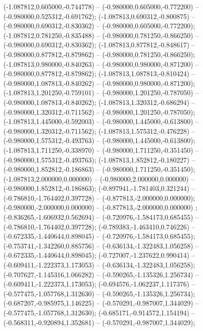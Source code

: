  (-1.087812,0.605000,-0.744778) -- (-0.980000,0.605000,-0.772200) -- (-0.980000,0.525312,-0.691762);
 (-1.087813,0.690312,-0.800875) -- (-0.980000,0.690312,-0.830362) -- (-0.980000,0.605000,-0.772200);
 (-1.087812,0.781250,-0.835488) -- (-0.980000,0.781250,-0.866250) -- (-0.980000,0.690312,-0.830362);
 (-1.087813,0.877812,-0.848617) -- (-0.980000,0.877812,-0.879862) -- (-0.980000,0.781250,-0.866250);
 (-1.087813,0.980000,-0.840263) -- (-0.980000,0.980000,-0.871200) -- (-0.980000,0.877812,-0.879862);
 (-1.087813,1.087813,-0.810424) -- (-0.980000,1.087813,-0.840262) -- (-0.980000,0.980000,-0.871200);
 (-1.087813,1.201250,-0.759101) -- (-0.980000,1.201250,-0.787050) -- (-0.980000,1.087813,-0.840262);
 (-1.087813,1.320312,-0.686294) -- (-0.980000,1.320312,-0.711562) -- (-0.980000,1.201250,-0.787050);
 (-1.087813,1.445000,-0.592003) -- (-0.980000,1.445000,-0.613800) -- (-0.980000,1.320312,-0.711562);
 (-1.087813,1.575312,-0.476228) -- (-0.980000,1.575312,-0.493763) -- (-0.980000,1.445000,-0.613800);
 (-1.087813,1.711250,-0.338970) -- (-0.980000,1.711250,-0.351450) -- (-0.980000,1.575312,-0.493763);
 (-1.087813,1.852812,-0.180227) -- (-0.980000,1.852812,-0.186863) -- (-0.980000,1.711250,-0.351450);
 (-1.087813,2.000000,0.000000) -- (-0.980000,2.000000,0.000000) -- (-0.980000,1.852812,-0.186863);
 (-0.897941,-1.781403,0.321244) -- (-0.786810,-1.764402,0.397728) -- (-0.877813,-2.000000,0.000000);
 (-0.980000,-2.000000,0.000000) -- (-0.877813,-2.000000,0.000000) ;
 (-0.836265,-1.606932,0.562694) -- (-0.720976,-1.584173,0.685455) -- (-0.786810,-1.764402,0.397728);
 (-0.789383,-1.463410,0.746226) -- (-0.672335,-1.440644,0.898045) -- (-0.720976,-1.584173,0.685455);
 (-0.753741,-1.342260,0.885756) -- (-0.636134,-1.322483,1.056258) -- (-0.672335,-1.440644,0.898045);
 (-0.727007,-1.237622,0.990414) -- (-0.609411,-1.222373,1.173053) -- (-0.636134,-1.322483,1.056258);
 (-0.707627,-1.145316,1.066282) -- (-0.590265,-1.135326,1.256734) -- (-0.609411,-1.222373,1.173053);
 (-0.694576,-1.062237,1.117376) -- (-0.577475,-1.057768,1.312630) -- (-0.590265,-1.135326,1.256734);
 (-0.687207,-0.985975,1.146225) -- (-0.570291,-0.987007,1.344029) -- (-0.577475,-1.057768,1.312630);
 (-0.685171,-0.914572,1.154194) -- (-0.568311,-0.920894,1.352681) -- (-0.570291,-0.987007,1.344029);
